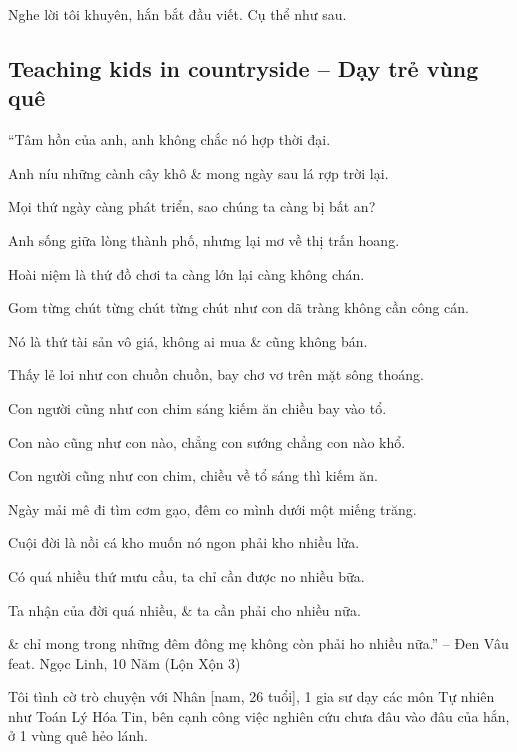 \documentclass[12pt]{article}
\begin{document}
Nghe lời tôi khuyên, hắn bắt đầu viết. Cụ thể như sau.

\subsection{Teaching kids in countryside -- Dạy trẻ vùng quê}

\begin{center}
	``Tâm hồn của anh, anh không chắc nó hợp thời đại.
	
	Anh níu những cành cây khô \& mong ngày sau lá rợp trời lại.
	
	Mọi thứ ngày càng phát triển, sao chúng ta càng bị bất an?
	
	Anh sống giữa lòng thành phố, nhưng lại mơ về thị trấn hoang.
	
	Hoài niệm là thứ đồ chơi ta càng lớn lại càng không chán.
	
	Gom từng chút từng chút từng chút như con dã tràng không cần công cán.
	
	Nó là thứ tài sản vô giá, không ai mua \& cũng không bán.
	
	Thấy lẻ loi như con chuồn chuồn, bay chơ vơ trên mặt sông thoáng.
	
	Con người cũng như con chim sáng kiếm ăn chiều bay vào tổ.
	
	Con nào cũng như con nào, chẳng con sướng chẳng con nào khổ.
	
	Con người cũng như con chim, chiều về tổ sáng thì kiếm ăn.
	
	Ngày mải mê đi tìm cơm gạo, đêm co mình dưới một miếng trăng.
	
	Cuội đời là nồi cá kho muốn nó ngon phải kho nhiều lửa.
	
	Có quá nhiều thứ mưu cầu, ta chỉ cần được no nhiều bữa.
	
	Ta nhận của đời quá nhiều, \& ta cần phải cho nhiều nữa.
	
	\& chỉ mong trong những đêm đông mẹ không còn phải ho nhiều nữa.'' -- {\sc Đen Vâu} feat. {\sc Ngọc Linh}, 10 Năm (Lộn Xộn 3)
\end{center}
Tôi tình cờ trò chuyện với Nhân [nam, 26 tuổi], 1 gia sư dạy các môn Tự nhiên như Toán Lý Hóa Tin, bên cạnh công việc nghiên cứu chưa đâu vào đâu của hắn, ở 1 vùng quê hẻo lánh.
\end{document}
